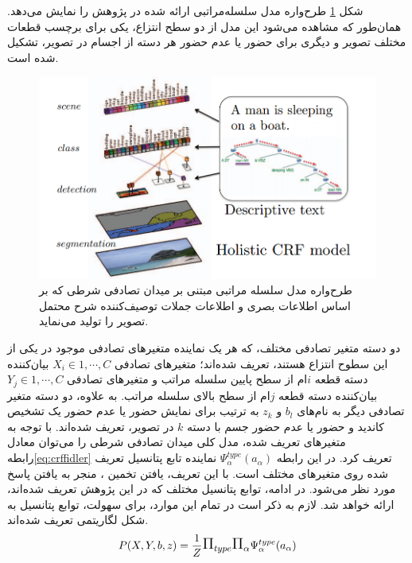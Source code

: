 شکل
\ref{fig:F2013SF1}
 طرح‌واره مدل سلسله‌مراتبی ارائه شده در پژوهش \cite{fidler2013sentence} را نمایش می‌دهد. همان‌طور که مشاهده می‌شود این مدل از دو سطح انتزاع، یکی برای برچسب قطعات مختلف تصویر و دیگری برای حضور یا عدم حضور هر دسته از اجسام در تصویر، تشکیل شده است.

\begin{figure}[h]
\center
\includegraphics[scale=0.5]{./Imgs/fidler2013sentence_f1.png}
\caption[مدل سلسله‌مراتبی میدان تصادفی شرطی در درک صحنه]{طرح‌واره مدل سلسله مراتبی مبتنی بر میدان تصادفی شرطی که بر اساس اطلاعات بصری و اطلاعات جملات توصیف‌کننده شرح محتمل تصویر را تولید می‌نماید\cite{fidler2013sentence}.}
\label{fig:F2013SF1}
\end{figure}

دو دسته متغیر تصادفی مختلف، که هر یک نماینده متغیرهای تصادفی موجود در یکی از این سطوح انتزاع هستند، تعریف شده‌اند؛ 
متغیرهای تصادفی $X_i \in {1, \cdots,C}$ بیان‌کننده دسته قطعه $i$ام از سطح پایین سلسله مراتب و متغیرهای تصادفی $Y_j \in {1, \cdots,C}$ بیان‌کننده دسته قطعه $j$ام از سطح بالای سلسله مراتب.
به علاوه، دو دسته متغیر تصادفی دیگر به نام‌های $b_l$ و $z_k$ به ترتیب برای نمایش حضور یا عدم حضور یک تشخیص کاندید و حضور یا عدم حضور جسم با دسته $k$ در تصویر، تعریف شده‌اند. با توجه به متغیرهای تعریف شده، مدل کلی میدان تصادفی شرطی را می‌توان معادل رابطه\ref{eq:crffidler} تعریف کرد. در این رابطه $\Psi_\alpha^{type}(a_\alpha)$ نماینده تابع پتانسیل تعریف شده روی متغیرهای مختلف است. با این تعریف، یافتن تخمین ، منجر به یافتن پاسخ مورد نظر می‌شود.
در ادامه، توابع پتانسیل مختلف که در این پژوهش تعریف شده‌اند، ارائه خواهد شد. لازم به ذکر است در تمام این موارد، برای سهولت، توابع پتانسیل به شکل لگاریتمی تعریف شده‌اند.
\begin{equation}
P(X,Y,b,z) = \frac{1}{Z} \mathlarger{\mathlarger{\Pi}}_{type} \mathlarger{\mathlarger{\Pi}}_\alpha \Psi_\alpha^{type}(a_\alpha)
\label{eq:crffidler}
\end{equation}

